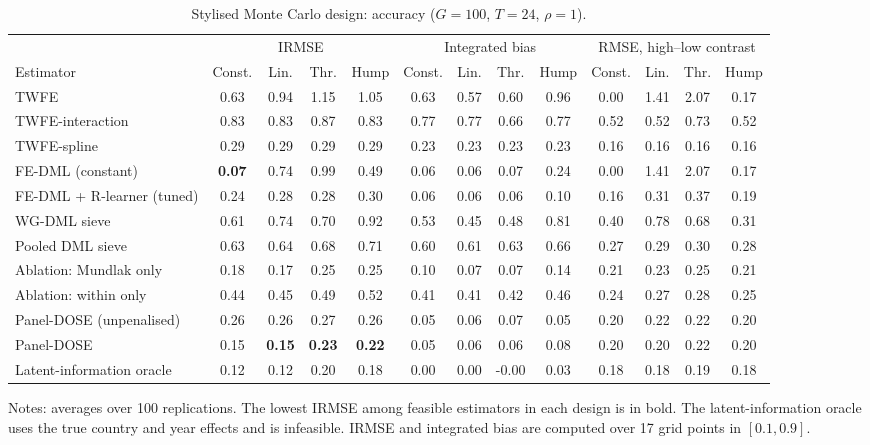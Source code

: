 \documentclass[preprint,12pt,authoryear]{elsarticle}
\begin{document}
\begin{table}[!t]
\centering
\begin{threeparttable}
\caption{Stylised Monte Carlo design: accuracy ($G=100$, $T=24$, $\rho=1$).}\label{tab:sim}
\scriptsize
\setlength{\tabcolsep}{3pt}
\begin{tabular}{lcccccccccccc}
\toprule
 & \multicolumn{4}{c}{IRMSE} & \multicolumn{4}{c}{Integrated bias} & \multicolumn{4}{c}{RMSE, high--low contrast}\\
\cmidrule(lr){2-5}\cmidrule(lr){6-9}\cmidrule(lr){10-13}
Estimator & Const. & Lin. & Thr. & Hump & Const. & Lin. & Thr. & Hump & Const. & Lin. & Thr. & Hump\\
\midrule
TWFE & 0.63 & 0.94 & 1.15 & 1.05 & 0.63 & 0.57 & 0.60 & 0.96 & 0.00 & 1.41 & 2.07 & 0.17\\
TWFE-interaction & 0.83 & 0.83 & 0.87 & 0.83 & 0.77 & 0.77 & 0.66 & 0.77 & 0.52 & 0.52 & 0.73 & 0.52\\
TWFE-spline & 0.29 & 0.29 & 0.29 & 0.29 & 0.23 & 0.23 & 0.23 & 0.23 & 0.16 & 0.16 & 0.16 & 0.16\\
FE-DML (constant) & \textbf{0.07} & 0.74 & 0.99 & 0.49 & 0.06 & 0.06 & 0.07 & 0.24 & 0.00 & 1.41 & 2.07 & 0.17\\
FE-DML + R-learner (tuned) & 0.24 & 0.28 & 0.28 & 0.30 & 0.06 & 0.06 & 0.06 & 0.10 & 0.16 & 0.31 & 0.37 & 0.19\\
WG-DML sieve & 0.61 & 0.74 & 0.70 & 0.92 & 0.53 & 0.45 & 0.48 & 0.81 & 0.40 & 0.78 & 0.68 & 0.31\\
Pooled DML sieve & 0.63 & 0.64 & 0.68 & 0.71 & 0.60 & 0.61 & 0.63 & 0.66 & 0.27 & 0.29 & 0.30 & 0.28\\
Ablation: Mundlak only & 0.18 & 0.17 & 0.25 & 0.25 & 0.10 & 0.07 & 0.07 & 0.14 & 0.21 & 0.23 & 0.25 & 0.21\\
Ablation: within only & 0.44 & 0.45 & 0.49 & 0.52 & 0.41 & 0.41 & 0.42 & 0.46 & 0.24 & 0.27 & 0.28 & 0.25\\
Panel-DOSE (unpenalised) & 0.26 & 0.26 & 0.27 & 0.26 & 0.05 & 0.06 & 0.07 & 0.05 & 0.20 & 0.22 & 0.22 & 0.20\\
Panel-DOSE & 0.15 & \textbf{0.15} & \textbf{0.23} & \textbf{0.22} & 0.05 & 0.06 & 0.06 & 0.08 & 0.20 & 0.20 & 0.22 & 0.20\\
Latent-information oracle & 0.12 & 0.12 & 0.20 & 0.18 & 0.00 & 0.00 & -0.00 & 0.03 & 0.18 & 0.18 & 0.19 & 0.18\\
\bottomrule
\end{tabular}
\begin{tablenotes}\scriptsize
\item Notes: averages over 100 replications. The lowest IRMSE among feasible estimators in each design is in bold. The latent-information oracle uses the true country and year effects and is infeasible. IRMSE and integrated bias are computed over 17 grid points in $[0.1,0.9]$.
\end{tablenotes}
\end{threeparttable}
\end{table}
\end{document}
